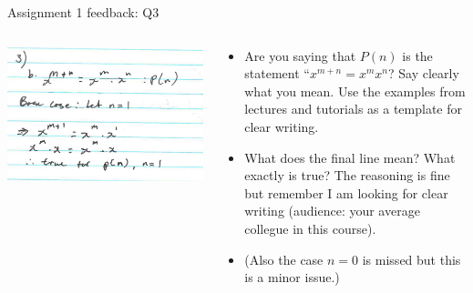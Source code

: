\documentclass[aspectratio=169]{beamer}
\begin{document}
\begin{frame}{Assignment 1 feedback: Q3}
\begin{columns}
\begin{column}{0.5\textwidth}
    \begin{center}
  \includegraphics[width=\textwidth]{ass1q3}
     \end{center}
\end{column}
\begin{column}{0.5\textwidth}
\begin{itemize}
  \item Are you saying that $ P(n) $ is the statement ``$x^{m+n} = x^m x^n $? Say clearly what you mean. Use the examples from lectures and tutorials as a template for clear writing.
  \item What does the final line mean? What exactly is true? The reasoning is fine but remember I am looking for clear writing (audience: your average collegue in this course).
  \item (Also the case $ n = 0 $ is missed but this is a minor issue.)
\end{itemize}
\end{column}
\end{columns}
\end{frame}
\end{document}
